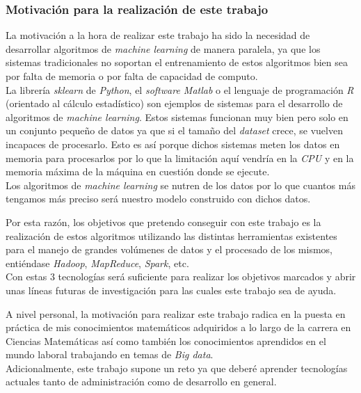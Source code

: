 \subsubsection*{Motivación para la realización de este trabajo}
La motivación a la hora de realizar este trabajo ha sido la necesidad de desarrollar algoritmos 
de \textit{machine learning} de manera paralela, ya que los sistemas tradicionales no soportan 
el entrenamiento de estos algoritmos bien sea por falta de memoria o por falta de capacidad de computo.\\
La librería \textit{sklearn} de \textit{Python}, el \textit{software Matlab} o el lenguaje de programación \textit{R}
(orientado al cálculo estadístico) son ejemplos de sistemas para el desarrollo de algoritmos de \textit{machine learning}.
Estos sistemas funcionan muy bien pero solo en un conjunto pequeño de datos ya que si el tamaño del \textit{dataset}
crece, se vuelven incapaces de procesarlo. Esto es así porque dichos sistemas meten los datos en memoria para
procesarlos por lo que la limitación aquí vendría en la \textit{CPU} y en la memoria máxima de la máquina en cuestión 
donde se ejecute.\\
Los algoritmos de \textit{machine learning} se nutren de los datos por lo que cuantos más tengamos más
preciso será nuestro modelo construido con dichos datos.

Por esta razón, los objetivos que pretendo conseguir con este trabajo es la realización de estos 
algoritmos utilizando las distintas herramientas existentes para el manejo de grandes volúmenes de 
datos y el procesado de los mismos, entiéndase \textit{Hadoop}, \textit{MapReduce}, \textit{Spark}, etc.\\
Con estas 3 tecnologías será suficiente para realizar los objetivos marcados y abrir unas líneas futuras 
de investigación para las cuales este trabajo sea de ayuda.
\newline

A nivel personal, la motivación para realizar este trabajo radica en la puesta en práctica de mis conocimientos
matemáticos adquiridos a lo largo de la carrera en Ciencias Matemáticas así como también los conocimientos
aprendidos en el mundo laboral trabajando en temas de \textit{Big data}.\\
Adicionalmente, este trabajo supone un reto ya que deberé aprender tecnologías actuales tanto de administración
como de desarrollo en general.

